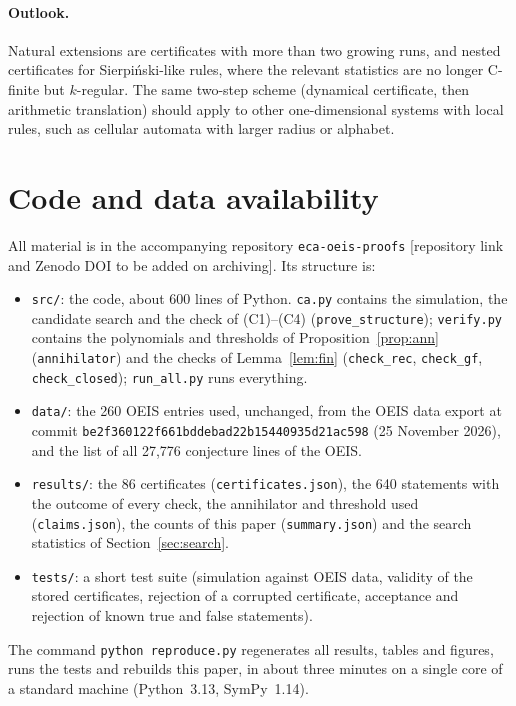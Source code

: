 \documentclass[11pt]{article}
\theoremstyle{definition}
\theoremstyle{remark}
\begin{document}
\paragraph{Outlook.} Natural extensions are certificates with more than two growing runs, and nested certificates for Sierpi\'nski-like rules, where the relevant statistics are no longer C-finite but $k$-regular. The same two-step scheme (dynamical certificate, then arithmetic translation) should apply to other one-dimensional systems with local rules, such as cellular automata with larger radius or alphabet.

\section*{Code and data availability}
All material is in the accompanying repository \texttt{eca-oeis-proofs} [repository link and Zenodo DOI to be added on archiving]. Its structure is:
\begin{itemize}
\item \texttt{src/}: the code, about 600 lines of Python. \texttt{ca.py} contains the simulation, the candidate search and the check of (C1)--(C4) (\texttt{prove\_structure}); \texttt{verify.py} contains the polynomials and thresholds of Proposition~\ref{prop:ann} (\texttt{annihilator}) and the checks of Lemma~\ref{lem:fin} (\texttt{check\_rec}, \texttt{check\_gf}, \texttt{check\_closed}); \texttt{run\_all.py} runs everything.
\item \texttt{data/}: the 260 OEIS entries used, unchanged, from the OEIS data export at commit \texttt{be2f360122f661bddebad22b15440935d21ac598} (25 November 2026), and the list of all 27{,}776 conjecture lines of the OEIS.
\item \texttt{results/}: the 86 certificates (\texttt{certificates.json}), the 640 statements with the outcome of every check, the annihilator and threshold used (\texttt{claims.json}), the counts of this paper (\texttt{summary.json}) and the search statistics of Section~\ref{sec:search}.
\item \texttt{tests/}: a short test suite (simulation against OEIS data, validity of the stored certificates, rejection of a corrupted certificate, acceptance and rejection of known true and false statements).
\end{itemize}
The command \texttt{python reproduce.py} regenerates all results, tables and figures, runs the tests and rebuilds this paper, in about three minutes on a single core of a standard machine (Python~3.13, SymPy~1.14).
\end{document}
